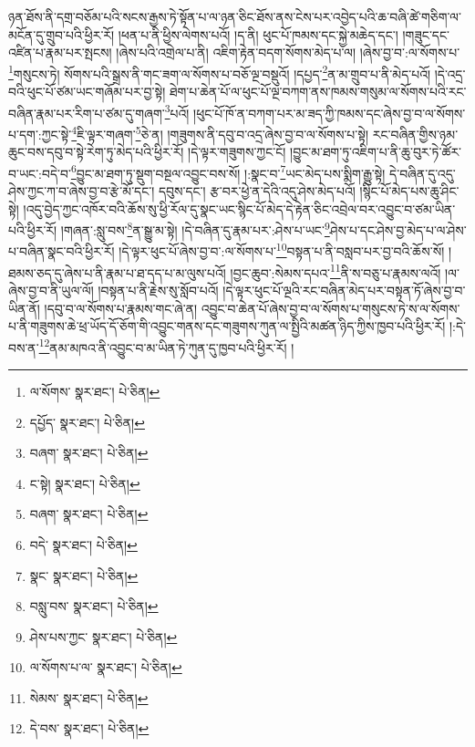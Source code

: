 ཉན་ཐོས་ནི་དགྲ་བཅོམ་པའི་སངས་རྒྱས་ཏེ་སྟོན་པ་ལ་ཉན་ཅིང་ཐོས་ནས་ངེས་པར་འབྱེད་པའི་ཆ་བཞི་ཚེ་གཅིག་ལ་མངོན་དུ་གྲུབ་པའི་ཕྱིར་རོ། །ཕན་པ་ནི་ཕྱིས་ལེགས་པའོ། །ད་ནི། ཕུང་པོ་ཁམས་དང་སྐྱེ་མཆེད་དང་། །གཟུང་དང་འཛིན་པ་རྣམ་པར་སྤངས། །ཞེས་པའི་འགྲེལ་པ་ནི། འཇིག་རྟེན་བདག་སོགས་མེད་པ་ལ། །ཞེས་བྱ་བ་:ལ་སོགས་པ་\footnote{ལ་སོགས་  སྣར་ཐང་།  པེ་ཅིན། }གསུངས་ཏེ། སོགས་པའི་སྒྲས་ནི་གང་ཟག་ལ་སོགས་པ་བཅོ་ལྔ་བསྡུའོ། །དཔྱད་\footnote{དཔྱོད་  སྣར་ཐང་།  པེ་ཅིན། }ན་མ་གྲུབ་པ་ནི་མེད་པའོ། །དེ་འདྲ་བའི་ཕུང་པོ་ཙམ་ཡང་གཞོམ་པར་བྱ་སྟེ། ཐེག་པ་ཆེན་པོ་ལ་ཕུང་པོ་ལྔ་བཀག་ནས་ཁམས་གསུམ་ལ་སོགས་པའི་རང་བཞིན་རྣམ་པར་རིག་པ་ཙམ་དུ་གཞག་\footnote{བཞག་  སྣར་ཐང་།  པེ་ཅིན། }པའོ། །ཕུང་པོ་ཁོ་ན་བཀག་པར་མ་ཟད་ཀྱི་ཁམས་དང་ཞེས་བྱ་བ་ལ་སོགས་པ་དག་:ཀྱང་སྟེ་\footnote{ང་སྟེ།   སྣར་ཐང་།  པེ་ཅིན། }ཇི་ལྟར་གཞག་\footnote{བཞག་  སྣར་ཐང་།  པེ་ཅིན། }ཅེ་ན། །གཟུགས་ནི་དབུ་བ་འདྲ་ཞེས་བྱ་བ་ལ་སོགས་པ་སྟེ། རང་བཞིན་གྱིས་ཉམ་ཆུང་བས་དབུ་བ་སྟེ་རེག་ཏུ་མེད་པའི་ཕྱིར་རོ། །དེ་ལྟར་གཟུགས་ཀྱང་ངོ། །བྱུང་མ་ཐག་ཏུ་འཇིག་པ་ནི་ཆུ་བུར་ཏེ་ཚོར་བ་ཡང་:བདེ་བ་\footnote{བདེ་  སྣར་ཐང་།  པེ་ཅིན། }བྱུང་མ་ཐག་ཏུ་སྡུག་བསྔལ་འབྱུང་བས་སོ། །:སྣང་བ་\footnote{སྣང་  སྣར་ཐང་།  པེ་ཅིན། }ཡང་མེད་པས་སྨིག་རྒྱུ་སྟེ། དེ་བཞིན་དུ་འདུ་ཤེས་ཀྱང་ཀ་བ་ཞེས་བྱ་བ་རྩེ་མོ་དང་། དབུས་དང་། རྩ་བར་ཕྱེ་ན་དེའི་འདུ་ཤེས་མེད་པའོ། །སྙིང་པོ་མེད་པས་ཆུ་ཤིང་སྟེ། །འདུ་བྱེད་ཀྱང་འཁོར་བའི་ཆོས་སུ་ཕྱི་རོལ་དུ་སྣང་ཡང་སྙིང་པོ་མེད་དེ་རྟེན་ཅིང་འབྲེལ་བར་འབྱུང་བ་ཙམ་ཡིན་པའི་ཕྱིར་རོ། །གཞན་:སླུ་བས་\footnote{བསླུ་བས་  སྣར་ཐང་།  པེ་ཅིན། }ན་སྒྱུ་མ་སྟེ། །དེ་བཞིན་དུ་རྣམ་པར་:ཤེས་པ་ཡང་\footnote{ཤེས་པས་ཀྱང་  སྣར་ཐང་།  པེ་ཅིན། }ཤེས་པ་དང་ཤེས་བྱ་མེད་པ་ལ་ཤེས་པ་བཞིན་སྣང་བའི་ཕྱིར་རོ། །དེ་ལྟར་ཕུང་པོ་ཞེས་བྱ་བ་:ལ་སོགས་པ་\footnote{ལ་སོགས་པ་ལ་  སྣར་ཐང་།  པེ་ཅིན། }བསྟན་པ་ནི་བསླབ་པར་བྱ་བའི་ཆོས་སོ། །ཐམས་ཅད་དུ་ཞེས་པ་ནི་རྣམ་པ་ཐ་དད་པ་མ་ལུས་པའོ། །བྱང་ཆུབ་:སེམས་དཔའ་\footnote{སེམས་  སྣར་ཐང་།  པེ་ཅིན། }ནི་ས་བཅུ་པ་རྣམས་ལའོ། །ལ་ཞེས་བྱ་བ་ནི་ཡུལ་ལོ། །བསྟན་པ་ནི་རྗེས་སུ་སློབ་པའོ། །དེ་ལྟར་ཕུང་པོ་ལྔའི་རང་བཞིན་མེད་པར་བསྟན་ཏོ་ཞེས་བྱ་བ་ཡིན་ནོ། །དབུ་བ་ལ་སོགས་པ་རྣམས་གང་ཞེ་ན། འབྱུང་བ་ཆེན་པོ་ཞེས་བྱ་བ་ལ་སོགས་པ་གསུངས་ཏེ་ས་ལ་སོགས་པ་ནི་གཟུགས་ཆེ་ཕྲ་ཡོད་དོ་ཅོག་གི་འབྱུང་གནས་དང་གཟུགས་ཀུན་ལ་སྤྱིའི་མཚན་ཉིད་ཀྱིས་ཁྱབ་པའི་ཕྱིར་རོ། །:དེ་བས་ན་\footnote{དེ་བས་  སྣར་ཐང་།  པེ་ཅིན། }ནམ་མཁའ་ནི་འབྱུང་བ་མ་ཡིན་ཏེ་ཀུན་དུ་ཁྱབ་པའི་ཕྱིར་རོ། །
